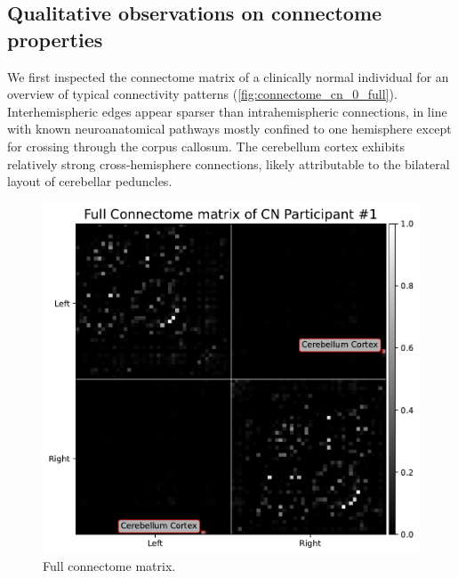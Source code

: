 \subsection{Qualitative observations on connectome properties}
We first inspected the connectome matrix of a clinically normal individual for an overview of typical connectivity patterns (\autoref{fig:connectome_cn_0_full}). Interhemispheric edges appear sparser than intrahemispheric connections, in line with known neuroanatomical pathways mostly confined to one hemisphere except for crossing through the corpus callosum. The cerebellum cortex exhibits relatively strong cross‐hemisphere connections, likely attributable to the bilateral layout of cerebellar peduncles. 

\begin{figure}[H]
    \includegraphics[width=0.8\linewidth]{figures/connectome_cn_0_full.pdf}
    \caption{Full connectome matrix.}
    \label{fig:connectome_cn_0_full}
\end{figure}

